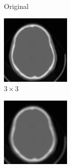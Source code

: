 \documentclass[letterpaper,12pt]{article}
\theoremstyle{plain}
\begin{document}
\begin{figure}[h]
\begin{subfigure}[h]{0.24\linewidth}
            \caption{Original} 
         \end{subfigure}
         \begin{subfigure}[h]{0.24\linewidth}
            \centering
            \includegraphics[width=\textwidth]{Figuras/ImagenC3x3.png}
            \caption{$3\times3$} 
         \end{subfigure}
         \begin{subfigure}[h]{0.24\linewidth}
            \centering
            \includegraphics[width=\textwidth]{Figuras/ImagenC5x5.png}

\end{subfigure}
\end{figure}
\end{document}
